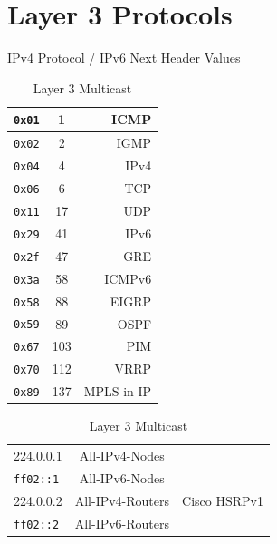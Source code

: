 \documentclass[12pt]{article}
\begin{document}
\section{Layer 3 Protocols \label{sec:L3}}
	\begin{table}[H]
	\begin{minipage}{.35\linewidth}
	\centering
	\caption{IPv4 Protocol / IPv6 Next Header Values \label{tab:L3 PROTOCOL}}
	\begin{tabular}{| c | c | r|}
	\hline
	\texttt{0x01}	& 1			& ICMP\\\hline
	\texttt{0x02}	& 2			& IGMP\\\hline
	\texttt{0x04}	& 4			& IPv4\\\hline
	\texttt{0x06}	& 6			& TCP\\\hline
	\texttt{0x11}	& 17			& UDP\\\hline
	\texttt{0x29}	& 41			& IPv6\\\hline
	\texttt{0x2f}		& 47			& GRE\\\hline
	\texttt{0x3a}	& 58			& ICMPv6\\\hline
	\texttt{0x58}	& 88			& EIGRP\\\hline
	\texttt{0x59}	& 89			& OSPF\\\hline
	\texttt{0x67}	& 103			& PIM\\\hline
	\texttt{0x70}	& 112			& VRRP\\\hline
	\texttt{0x89}	& 137			& MPLS-in-IP\\\hline
	\end{tabular}\end{minipage}%
	\begin{minipage}{.6\linewidth}
	\centering
	\caption{Layer 3 Multicast \label{tab:MULTICAST L3}}
	\begin{tabular}{| l | c | r|}
	\hline
	224.0.0.1		& All-IPv4-Nodes		&\\
	\texttt{ff02::1}	& All-IPv6-Nodes		&\\\hline
	224.0.0.2		& All-IPv4-Routers	& Cisco HSRPv1\\
	\texttt{ff02::2}	& All-IPv6-Routers	&\\\hline

\end{tabular}
\end{minipage}
\end{table}
\end{document}
